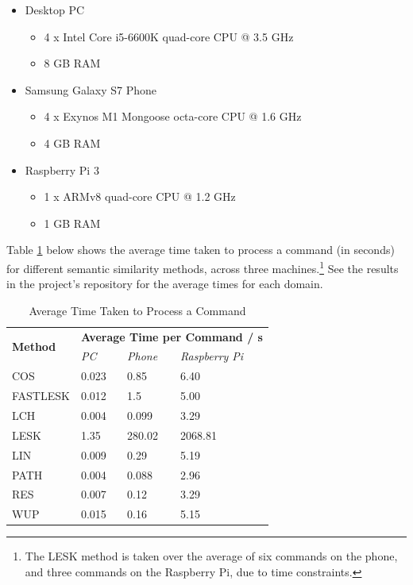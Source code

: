 \documentclass[11pt]{article}
\begin{document}
\begin{itemize}
\item Desktop PC
	\begin{itemize}
	\item 4 x Intel Core i5-6600K quad-core CPU @ 3.5 GHz
	\item 8 GB RAM
	\end{itemize}
\item Samsung Galaxy S7 Phone
	\begin{itemize}
	\item 4 x Exynos M1 Mongoose octa-core CPU @ 1.6 GHz \cite{RefWorks:127}
	\item 4 GB RAM
	\end{itemize}
\item Raspberry Pi 3
	\begin{itemize}
	\item 1 x ARMv8 quad-core CPU @ 1.2 GHz \cite{RefWorks:126}
	\item 1 GB RAM
	\end{itemize}
\end{itemize}

Table \ref{table:perf} below shows the average time taken to process a command (in seconds) for different semantic similarity methods, across three machines.\footnote{The LESK method is taken over the average of six commands on the phone, and three commands on the Raspberry Pi, due to time constraints.} See the results in the project's repository for the average times for each domain.

\begin{table}[H]
\centering
\caption{Average Time Taken to Process a Command}
\label{table:perf}
\begin{tabular}{l|l|l|l}
\multirow{2}{*}{\textbf{Method}} & \multicolumn{3}{l}{\textbf{Average Time per Command / s}} \\ \cline{2-4} 
                                 & \textit{PC}   & \textit{Phone}   & \textit{Raspberry Pi}   \\ \hline
COS                              & 0.023         & 0.85             & 6.40                    \\ \hline
FASTLESK                         & 0.012         & 1.5              & 5.00                    \\ \hline
LCH                              & 0.004         & 0.099            & 3.29                    \\ \hline
LESK                             & 1.35          & 280.02           & 2068.81 \\ \hline
LIN                              & 0.009         & 0.29             & 5.19                    \\ \hline
PATH                             & 0.004         & 0.088            & 2.96                    \\ \hline
RES                              & 0.007         & 0.12             & 3.29                    \\ \hline
WUP                              & 0.015         & 0.16             & 5.15                   
\end{tabular}
\end{table}
\end{document}
